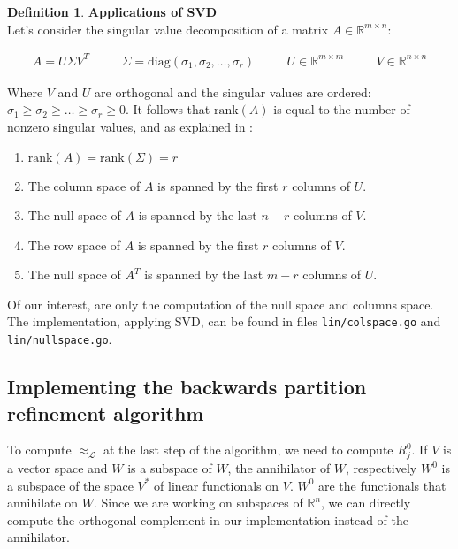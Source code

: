 \documentclass{article}
\theoremstyle{plain}%
\theoremstyle{definition}
\newtheorem{defn}{Definition}[section]
\theoremstyle{remark}
\def\R{\mathbb{R}}
\newcommand{\diag}[1]{\text{diag}\left(#1\right)}
\newcommand{\mrank}[1]{\text{rank}\left(#1\right)}
\newcommand{\llwb}{\approx_{\mathcal{L}}}
\begin{document}
\begin{defn}
  \textbf{Applications of SVD} \\

  Let's consider the singular value decomposition of a matrix $A \in \R^{m \times n}$:

  \begin{equation*}
    \begin{aligned}
      A = U \Sigma V^T & \quad & \Sigma = \diag{\sigma_1, \sigma_2, \hdots, \sigma_r  } 
       & \quad &  U \in \R^{m \times m} & \quad & V \in \R^{n \times n}
    \end{aligned}
  \end{equation*}

  Where $V$ and $U$ are orthogonal and the singular values are ordered: $\sigma_1 \geq \sigma_2 \geq \hdots \geq \sigma_r \geq 0$.
  It follows that $\mrank{A}$ is equal to the number of nonzero singular values, and
  as explained in \cite{svd}:
  
  \begin{enumerate}
    \item  $\mrank{A} = \mrank{\Sigma} = r$
    \item The column space of $A$ is spanned by the first $r$ columns of $U$.
    \item The null space of $A$ is spanned by the last $n − r$ columns of $V$.
    \item The row space of $A$ is spanned by the first $r$ columns of $V$.
    \item The null space of $A^T$ is spanned by the last $m − r$ columns of $U$.
  \end{enumerate}
  
  Of our interest, are only the computation of the null space and columns space.
  The implementation, applying SVD, 
  can be found in files \texttt{lin/colspace.go} and \texttt{lin/nullspace.go}.
\end{defn}






\subsection{Implementing the backwards partition refinement algorithm}

To compute $\llwb$ at the last step of the algorithm,
we need to compute $R_j^0$.
If $V$ is a vector space and $W$ is a
subspace of $W$, the annihilator of $W$, respectively $W^0$ is 
a subspace of the space $V^*$ of linear functionals on $V$.
$W^0$ are the functionals that annihilate on $W$. Since 
we are working on subspaces of $\R^n$, we can directly compute 
the orthogonal complement in our implementation instead of the
annihilator.
\end{document}
